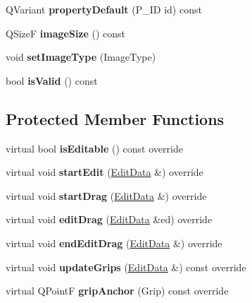 \begin{DoxyCompactItemize}
\item 
\mbox{\label{class_ms_1_1_image_ab3a18d9bc0c982cfef73792826283078}} 
Q\+Variant {\bfseries property\+Default} (P\+\_\+\+ID id) const
\item 
\mbox{\label{class_ms_1_1_image_a4b4c72163ade89c56ba896b0604a9144}} 
Q\+SizeF {\bfseries image\+Size} () const
\item 
\mbox{\label{class_ms_1_1_image_a3875429a82cf389eb6de44f5e7fd42b4}} 
void {\bfseries set\+Image\+Type} (Image\+Type)
\item 
\mbox{\label{class_ms_1_1_image_aadd052dbc8901033f78f89480d1e8a00}} 
bool {\bfseries is\+Valid} () const
\end{DoxyCompactItemize}
\subsection*{Protected Member Functions}
\begin{DoxyCompactItemize}
\item 
\mbox{\label{class_ms_1_1_image_adab0fd67562ad02ef0d81feef10dc9e1}} 
virtual bool {\bfseries is\+Editable} () const override
\item 
\mbox{\label{class_ms_1_1_image_a3a8065cb52f5821fbf5eec40d9d9c300}} 
virtual void {\bfseries start\+Edit} (\hyperlink{class_ms_1_1_edit_data}{Edit\+Data} \&) override
\item 
\mbox{\label{class_ms_1_1_image_a4e006b819bc648c55ff549cd5edd5b71}} 
virtual void {\bfseries start\+Drag} (\hyperlink{class_ms_1_1_edit_data}{Edit\+Data} \&) override
\item 
\mbox{\label{class_ms_1_1_image_a04cd5b58b9458c4e70804cadc63f872f}} 
virtual void {\bfseries edit\+Drag} (\hyperlink{class_ms_1_1_edit_data}{Edit\+Data} \&ed) override
\item 
\mbox{\label{class_ms_1_1_image_aa185c5bb95757a04c3d0f9e271cfdc48}} 
virtual void {\bfseries end\+Edit\+Drag} (\hyperlink{class_ms_1_1_edit_data}{Edit\+Data} \&) override
\item 
\mbox{\label{class_ms_1_1_image_ab238bb36a54bc67ce32680db15435dcd}} 
virtual void {\bfseries update\+Grips} (\hyperlink{class_ms_1_1_edit_data}{Edit\+Data} \&) const override
\item 
\mbox{\label{class_ms_1_1_image_a53312590d28b619e0a3bcd3908e3754d}} 
virtual Q\+PointF {\bfseries grip\+Anchor} (Grip) const override
\end{DoxyCompactItemize}
